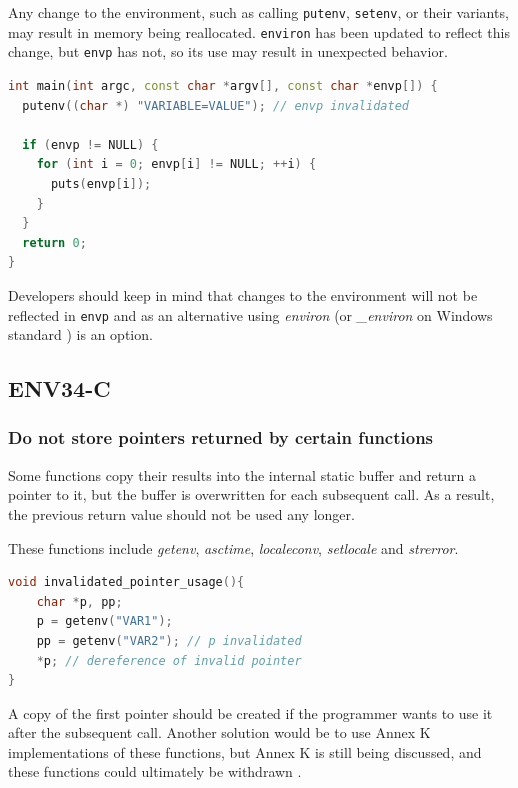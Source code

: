 Any change to the environment, such as calling \lstinline{putenv}, \lstinline{setenv}, or their variants, may result in memory being reallocated. \lstinline{environ}  has been updated to reflect this change, but \lstinline{envp} has not, so its use may result in unexpected behavior. 


\begin{lstlisting}[language={C++}]
int main(int argc, const char *argv[], const char *envp[]) {
  putenv((char *) "VARIABLE=VALUE"); // envp invalidated
  
  if (envp != NULL) {
    for (int i = 0; envp[i] != NULL; ++i) {
      puts(envp[i]);
    }
  }
  return 0;
}

\end{lstlisting}

Developers should keep in mind that changes to the environment will not be reflected in \lstinline{envp} and as an alternative using \emph{environ} (or \emph{\_environ} on Windows standard \cite{wenviron}) is an option.

\subsection{ENV34-C} \label{env34}
\subsubsection{Do not store pointers returned by certain functions}
Some functions copy their results into the internal static buffer and return a pointer to it, but the buffer is overwritten for each subsequent call.
As a result, the previous return value should not be used any longer. 

These functions include \emph{getenv}, \emph{asctime}, \emph{localeconv}, \emph{setlocale} and \emph{strerror}. 

\begin{lstlisting}[language={C++}]
void invalidated_pointer_usage(){
    char *p, pp;
    p = getenv("VAR1");
    pp = getenv("VAR2"); // p invalidated
    *p; // dereference of invalid pointer
}

\end{lstlisting}

A copy of the first pointer should be created if the programmer wants to use it after the subsequent call.
Another solution would be to use Annex K implementations of these functions, but Annex K is still being discussed, and these functions could ultimately be withdrawn \cite{annexk}. 


